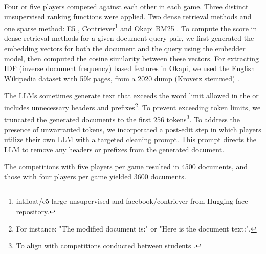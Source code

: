 Four or five players competed against each other in each game. Three distinct unsupervised ranking functions were applied. Two dense retrieval methods and one sparse method: E5 \cite{wang_text_2024}, Contriever\footnote{intfloat/e5-large-unsupervised and facebook/contriever from Hugging face repository.} \cite{izacard_unsupervised_2022} and Okapi BM25 \cite{maron_relevance_1960}. To compute the score in dense retrieval methods for a given document-query pair, we first generated the embedding vectors for both the document and the query using the embedder model, then computed the cosine similarity between these vectors. For extracting IDF (inverse document frequency) based features in Okapi, we used the English Wikipedia dataset with 59k pages, from a 2020 dump (Krovetz stemmed) \cite{Frej2020Wikir,Frej2020MlWikir}.

The LLMs sometimes generate text that exceeds the word limit allowed in the \shared{} or includes unnecessary headers and prefixes\footnote{For instance: "The modified document is:" or "Here is the document text:".}. To prevent exceeding token limits, we truncated the generated documents to the first 256 tokens\footnote{To align with competitions conducted between students \cite{raifer_information_2017, nachimovsky_ranking-incentivized_2024, mordo_search_2025}.}. To address the presence of unwarranted tokens, we incorporated a post-edit step in which players utilize their own LLM with a targeted cleaning prompt. This prompt directs the LLM to remove any headers or prefixes from the generated document.



The competitions with five players per game resulted in 4500 documents, and those with four players per game yielded 3600 documents.
